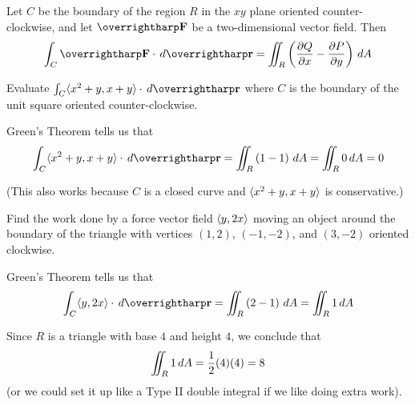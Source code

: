 \documentclass[letterpaper, twoside, 12pt]{book}
\begin{document}
\begin{theorem}
  Let $C$ be the boundary of the region $R$ in the $xy$ plane oriented
  counter-clockwise, and let $\vect{F}$ be a two-dimensional vector field. Then
  \[
    \int_C \vect{F}\cdot\dvar{\vect{r}}
      =
    \iint_R \left(\frac{\p Q}{\p x}-\frac{\p P}{\p y}\right)\dvar{A}
  \]
\end{theorem}

          \begin{problem}
            Evaluate $\int_C\<x^2+y,x+y\>\cdot\dvar{\vect r}$ where
            $C$ is the boundary of the unit square oriented counter-clockwise.
          \end{problem}

          \begin{solution}
            Green's Theorem tells us that
            \[
              \int_C \<x^2+y,x+y\>\cdot\dvar{\vect{r}}
                =
              \iint_R \left(1-1\right)\dvar{A}
                =
              \iint_R 0\dvar{A}
                =
              0
            \]

            (This also works because \(C\) is a closed curve and
            \(\langle x^2+y,x+y\rangle\) is conservative.)
          \end{solution}

          \begin{problem}
            Find the work done by a force vector field $\langle y,2x\rangle$ moving an
            object around the
            boundary of the triangle with vertices $(1,2)$, $(-1,-2)$, and
            $(3,-2)$ oriented clockwise.
          \end{problem}

          \begin{solution}
            Green's Theorem tells us that
            \[
              \int_C \<y,2x\>\cdot\dvar{\vect{r}}
                =
              \iint_R \left(2-1\right)\dvar{A}
                =
              \iint_R 1\dvar{A}
            \]

            Since \(R\) is a triangle with base \(4\) and height \(4\),
            we conclude that
            \[
              \iint_R 1\,d{A}
                =
              \frac{1}{2}(4)(4)
                =
              8
            \]
            (or we could set it up like a Type II double integral
            if we like doing extra work).
          \end{solution}
\end{document}
